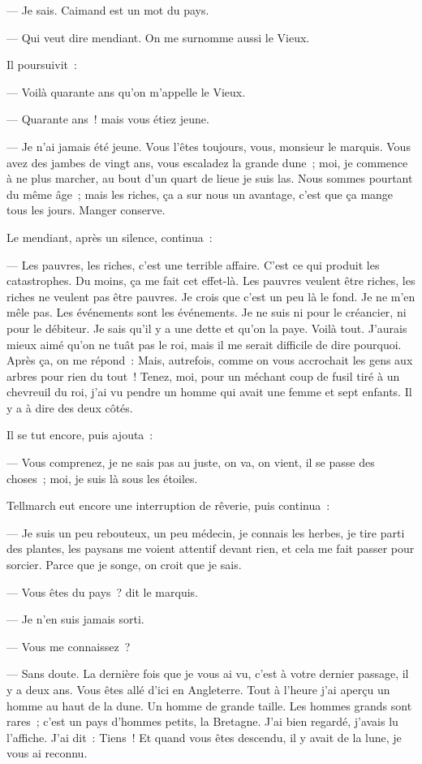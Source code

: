 \documentclass[french,twoside]{book} %
\begin{document}
— Je sais. Caimand est un mot du pays.\par
— Qui veut dire mendiant. On me surnomme aussi le Vieux.\par
Il poursuivit :\par
— Voilà quarante ans qu’on m’appelle le Vieux.\par
 — Quarante ans ! mais vous étiez jeune.\par
— Je n’ai jamais été jeune. Vous l’êtes toujours, vous, monsieur le marquis. Vous avez des jambes de vingt ans, vous escaladez la grande dune ; moi, je commence à ne plus marcher, au bout d’un quart de lieue je suis las. Nous sommes pourtant du même âge ; mais les riches, ça a sur nous un avantage, c’est que ça mange tous les jours. Manger conserve.\par
Le mendiant, après un silence, continua :\par
— Les pauvres, les riches, c’est une terrible affaire. C’est ce qui produit les catastrophes. Du moins, ça me fait cet effet-là. Les pauvres veulent être riches, les riches ne veulent pas être pauvres. Je crois que c’est un peu là le fond. Je ne m’en mêle pas. Les événements sont les événements. Je ne suis ni pour le créancier, ni pour le débiteur. Je sais qu’il y a une dette et qu’on la paye. Voilà tout. J’aurais mieux aimé qu’on ne tuât pas le roi, mais il me serait difficile de dire pourquoi. Après ça, on me répond : Mais, autrefois, comme on vous accrochait les gens aux arbres pour rien du tout ! Tenez, moi, pour un méchant coup de fusil tiré à un chevreuil du roi, j’ai vu pendre un homme qui avait une femme et sept enfants. Il y a à dire des deux côtés.\par
Il se tut encore, puis ajouta :\par
— Vous comprenez, je ne sais pas au juste, on va, on vient, il se passe des choses ; moi, je suis là sous les étoiles.\par
Tellmarch eut encore une interruption de rêverie, puis continua :\par
 — Je suis un peu rebouteux, un peu médecin, je connais les herbes, je tire parti des plantes, les paysans me voient attentif devant rien, et cela me fait passer pour sorcier. Parce que je songe, on croit que je sais.\par
— Vous êtes du pays ? dit le marquis.\par
— Je n’en suis jamais sorti.\par
— Vous me connaissez ?\par
— Sans doute. La dernière fois que je vous ai vu, c’est à votre dernier passage, il y a deux ans. Vous êtes allé d’ici en Angleterre. Tout à l’heure j’ai aperçu un homme au haut de la dune. Un homme de grande taille. Les hommes grands sont rares ; c’est un pays d’hommes petits, la Bretagne. J’ai bien regardé, j’avais lu l’affiche. J’ai dit : Tiens ! Et quand vous êtes descendu, il y avait de la lune, je vous ai reconnu.\par
\end{document}
